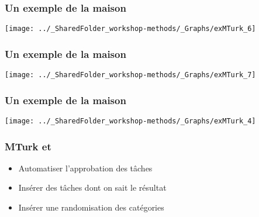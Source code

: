 \documentclass{beamer}
\begin{document}

  \begin{frame}
	        \frametitle{Un exemple de la maison} \vspace{1cm}   
	        \begin{center}
	           \texttt{[image: ../\_SharedFolder\_workshop-methods/\_Graphs/exMTurk\_6]}
	        \end{center}  
	    \end{frame}
    

  \begin{frame}
	        \frametitle{Un exemple de la maison} \vspace{1cm}   
	        \begin{center}
	           \texttt{[image: ../\_SharedFolder\_workshop-methods/\_Graphs/exMTurk\_7]}
	        \end{center}  
	    \end{frame}
    

     \begin{frame}
	        \frametitle{Un exemple de la maison} \vspace{1cm}   
	        \begin{center}
	           \texttt{[image: ../\_SharedFolder\_workshop-methods/\_Graphs/exMTurk\_4]}
	        \end{center}  
	    \end{frame}
	    
	   

    \begin{frame}
    
      \frametitle{MTurk et \R} \vspace{1cm}
      
       \begin{itemize}
          \item{Automatiser l'approbation des tâches}
          \item{Insérer des tâches dont on sait le résultat}
          \item{Insérer une randomisation des catégories}
        \end{itemize}
         
    \end{frame}  
    
    
\end{document}
